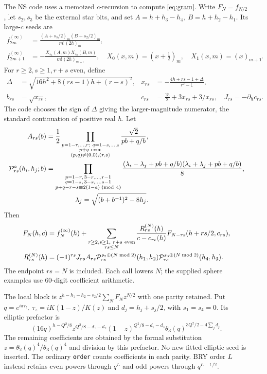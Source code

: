 \documentclass[11pt]{article}
\newcommand{\code}[1]{\texttt{\small #1}}
\begin{document}
The NS code uses a memoized \(c\)-recursion to compute
\eqref{eq:gram}. Write \(F_N=f_{N/2}\), let \(s_2,s_3\) be the
external star bits, and set \(A=h+h_3-h_4,\ B=h+h_2-h_1\).
Its large-\(c\) seeds are
\begin{align}
 f_{2m}^{(\infty)}
 &=\frac{(A+s_3/2)_m(B+s_2/2)_m}{m!(2h)_m},\\
 f_{2m+1}^{(\infty)}
 &=-\frac{X_{s_3}(A,m)X_{s_2}(B,m)}{m!(2h)_{m+1}},
 \quad X_0(x,m)=(x+\tfrac12)_m,\quad X_1(x,m)=(x)_{m+1}.
\end{align}
For \(r\ge2,s\ge1,r+s\) even, define
\begin{align}
 \Delta&=\sqrt{16h^2+8(rs-1)h+(r-s)^2},&
 x_{rs}&=-\frac{4h+rs-1+\Delta}{r^2-1},\\
 b_{rs}&=\sqrt{x_{rs}},&
 c_{rs}&=\frac{15}{2}+3x_{rs}+3/x_{rs},\quad
 J_{rs}=-\partial_hc_{rs}.
\end{align}
The code chooses the sign of \(\Delta\) giving the larger-magnitude
numerator, the standard continuation of positive real \(h\). Let
\begin{align}
 A_{rs}(b)&=\frac12
 \prod_{\substack{p=1-r,\ldots,r;\ q=1-s,\ldots,s\\p+q\ {\rm even}\\
                  (p,q)\ne(0,0),(r,s)}}\frac{\sqrt2}{pb+q/b},\\
 {\cal P}_{rs}^a(h_i,h_j;b)&=
 \prod_{\substack{p=1-r,\,3-r,\ldots,r-1\\q=1-s,\,3-s,\ldots,s-1\\
                  p+q-r-s\equiv2(1-a)\;({\rm mod}\ 4)}}
 \frac{(\lambda_i-\lambda_j+pb+q/b)(\lambda_i+\lambda_j+pb+q/b)}8,\nonumber\\
 &\hspace{15mm}\lambda_j=\sqrt{(b+b^{-1})^2-8h_j}.
\end{align}
Then
\begin{align}
 F_N(h,c)&=f_N^{(\infty)}(h)+\sum_{\substack{r\ge2,s\ge1,\ r+s\ {\rm even}\\rs\le N}}
 \frac{R_{rs}^{(N)}(h)}{c-c_{rs}(h)}
 F_{N-rs}(h+rs/2,c_{rs}),\label{eq:ns-recursion}\\
 R_{rs}^{(N)}(h)&=(-1)^{rs}J_{rs}A_{rs}
 {\cal P}_{rs}^{s_2\oplus(N\bmod2)}(h_1,h_2)
 {\cal P}_{rs}^{s_3\oplus(N\bmod2)}(h_4,h_3).\nonumber
\end{align}
The endpoint \(rs=N\) is included. Each call lowers \(N\);
the supplied sphere examples use 60-digit coefficient arithmetic.

The local block is
\(z^{h-h_1-h_2-s_2/2}\sum_NF_Nz^{N/2}\) with one parity retained.
Put \(q=e^{i\pi\tau_z}\), \(\tau_z=iK(1-z)/K(z)\) and
\(d_j=h_j+s_j/2\), with \(s_1=s_4=0\). Its elliptic prefactor is
\begin{equation}
 (16q)^{h-Q^2/8}z^{Q^2/8-d_1-d_2}(1-z)^{Q^2/8-d_2-d_3}
 \theta_3(q)^{3Q^2/2-4\sum_jd_j}.
\end{equation}
The remaining coefficients are obtained by the formal substitution
\(z=\theta_2(q)^4/\theta_3(q)^4\) and division by this prefactor.
No new fitted elliptic seed is inserted. The ordinary \code{order}
counts coefficients in each parity. BRY order \(L\) instead retains
even powers through \(q^L\) and odd powers through \(q^{L-1/2}\).
\end{document}
